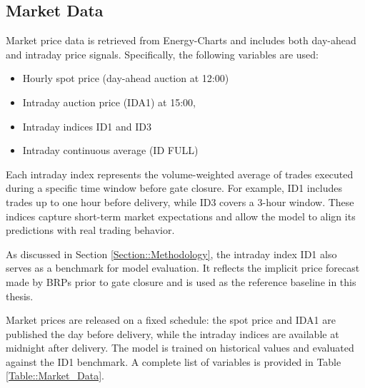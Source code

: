 \documentclass[class=scrbook, crop=false]{standalone}
\begin{document}
\subsection{Market Data}
\label{Section::Market_Data}

Market price data is retrieved from Energy-Charts and includes both day-ahead and intraday price signals. Specifically, the following variables are used:
\begin{itemize}
\item Hourly spot price (day-ahead auction at 12:00)
\item Intraday auction price (IDA1) at 15:00,
\item Intraday indices ID1 and ID3
\item Intraday continuous average (ID FULL)
\end{itemize}

Each intraday index represents the volume-weighted average of trades executed during a specific time window before gate closure. For example, ID1 includes trades up to one hour before delivery, while ID3 covers a 3-hour window. These indices capture short-term market expectations and allow the model to align its predictions with real trading behavior.

As discussed in Section \ref{Section::Methodology}, the intraday index ID1 also serves as a benchmark for model evaluation. It reflects the implicit price forecast made by BRPs prior to gate closure and is used as the reference baseline in this thesis.

Market prices are released on a fixed schedule: the spot price and IDA1 are published the day before delivery, while the intraday indices are available at midnight after delivery. The model is trained on historical values and evaluated against the ID1 benchmark. A complete list of variables is provided in Table \ref{Table::Market_Data}.



\end{document}
